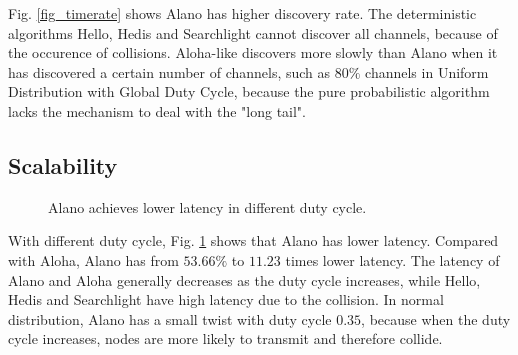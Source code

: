 Fig. \ref{fig_timerate} shows Alano has higher discovery rate. The deterministic algorithms Hello, Hedis and Searchlight cannot discover all channels, because of the occurence of collisions. Aloha-like discovers more slowly than Alano when it has discovered a certain number of channels, such as $80\%$ channels in Uniform Distribution with Global Duty Cycle, because the pure probabilistic algorithm lacks the mechanism to deal with the "long tail".




\subsection{Scalability}

\begin{figure}[!t]
\centering
{}
\hspace{0.01in}
\caption{Alano achieves lower latency in different duty cycle.}
\label{fig_dutycycle}
\end{figure}

With different duty cycle, Fig. \ref{fig_dutycycle} shows that Alano has lower latency. Compared with Aloha, Alano has from $53.66\%$ to $11.23$ times lower latency. The latency of Alano and Aloha generally decreases as the duty cycle increases, while Hello, Hedis and Searchlight have high latency due to the collision. In normal distribution, Alano has a small twist with duty cycle $0.35$, because when the duty cycle increases, nodes are more likely to transmit and therefore collide.


